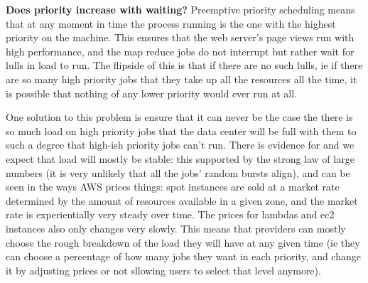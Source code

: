 \textbf{Does priority increase with waiting?}
% 
Preemptive priority scheduling means that at any moment in time the process
running is the one with the highest priority on the machine. This ensures that
the web server's page views run with high performance, and the map reduce jobs
do not interrupt but rather wait for lulls in load to run. The flipside of this
is that if there are no such lulls, ie if there are so many high priority jobs
that they take up all the resources all the time, it is possible that nothing of
any lower priority would ever run at all. 

One solution to this problem is ensure that it can never be the case the there
is so much load on high priority jobs that the data center will be full with
them to such a degree that high-ish priority jobs can't run. There is evidence
for and we expect that load will mostly be stable: this supported by the strong
law of large numbers (it is very unlikely that all the jobs' random  bursts
align), and can be seen in the ways AWS prices things: spot instances are sold
at a market rate determined by the amount of resources available in a given
zone\cite{TODO}, and the market rate is experientially very steady over
time\cite{TODO}. The prices for lambdas and ec2 instances also only changes very
slowly\cite{TODO}. This means that providers can mostly choose the rough
breakdown of the load they will have at any given time (ie they can choose a
percentage of how many jobs they want in each priority, and change it by
adjusting prices or not sllowing users to select that level anymore). 



